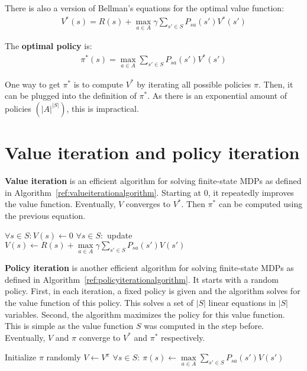 \documentclass{report}
\begin{document}
There is also a version of Bellman's equations for the optimal value function:
\begin{align*}
V^{*}(s) = R(s)+\max\limits_{a\in A} \gamma \sum_{s'\in S} P_{sa}(s')V^{*}(s')
\end{align*}

The {\bf optimal policy} is:
\begin{align*}
\pi^{*}(s) = \max\limits_{a\in A} \sum_{s'\in S} P_{sa}(s')V^{*}(s')
\end{align*}

One way to get $\pi^{*}$ is to compute $V^{*}$ by iterating all possible policies $\pi$. Then, it can be plugged into the definition of $\pi^{*}$. As there is an exponential amount of policies $(\vert A\vert^{\vert S \vert})$, this is impractical.

\section{Value iteration and policy iteration}
{\bf Value iteration} is an efficient algorithm for solving finite-state MDPs as defined in Algorithm~\ref{ref:valueiterationalgorithm}. Starting at 0, it repeatedly improves the value function. Eventually, $V$ converges to $V^{*}$. Then $\pi^{*}$ can be computed using the previous equation.

\begin{algorithm}[h!]
\caption{Value iteration}
\label{ref:valueiterationalgorithm}
\begin{algorithmic}
\State $\forall s\in S: V(s) \gets 0$
\Repeat
\State $\forall s\in S:$ update $V(s) \gets R(s) + \max\limits_{a\in A} \gamma \sum_{s'\in S} P_{sa}(s')V(s')$
\end{algorithmic}
\end{algorithm}

{\bf Policy iteration} is another efficient algorithm for solving finite-state MDPs as defined in Algorithm~\ref{ref:policyiterationalgorithm}. It starts with a random policy. First, in each iteration, a fixed policy is given and the algorithm solves for the value function of this policy. This solves a set of $\vert S\vert$ linear equations in $\vert S\vert$ variables. Second, the algorithm maximizes the policy for this value function. This is simple as the value function $S$ was computed in the step before. Eventually, $V$ and $\pi$ converge to $V^{*}$ and $\pi^{*}$ respectively.

\begin{algorithm}[h!]
\caption{Policy iteration}
\label{ref:policyiterationalgorithm}
\begin{algorithmic}
\State Initialize $\pi$ randomly
\Repeat
\State $V\gets V^{\pi}$
\State $\forall s\in S:\:\pi(s)\gets  \max\limits_{a\in A} \sum_{s'\in S} P_{sa}(s')V(s')$
\end{algorithmic}
\end{algorithm}
\end{document}

